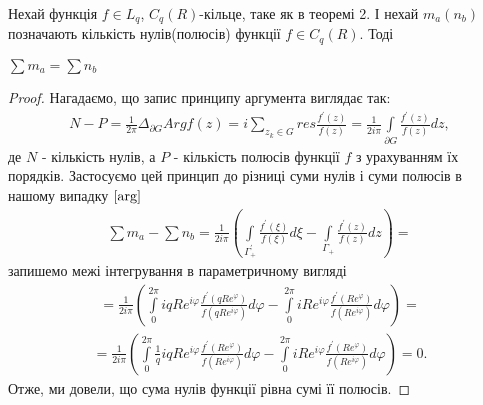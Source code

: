 \documentclass[12pt,a4paper]{article}
\begin{document}
\begin{thm}
Нехай функція $f\in L_{q}$, $C_{q}(R)$-кільце, таке як в теоремі 2. І нехай $m_{a}(n_{b})$ позначають кількість нулів(полюсів) функції $f \in C_{q}(R)$. Тоді 
\begin{center}
$\sum m_{a}=\sum n_{b}$
\end{center}
\end{thm}
\begin{proof}
Нагадаємо, що запис принципу аргумента виглядає так:
\begin{equation}\label{arg}
\begin{array}{l}                    
N-P=\frac{1}{2\pi} \Delta_{\partial G} Arg f(z) =i\sum\limits_{z_k\in G} res \frac{f^{'}(z)}{f(z)} = \frac{1}{2i\pi}\int\limits_{\partial G}^{ }\frac{f^{'}(z)}{f(z)} dz , 
\end{array}
\end{equation}
де $N$ - кількість нулів, а $P$ - кількість полюсів функції $f$ з урахуванням їх порядків.
Застосуємо цей принцип до різниці суми нулів і суми полюсів в нашому випадку $\eqref {arg} $
\[\begin{array}{l}
\sum m_{a}-\sum n_{b} = \frac{1}{2i\pi}(\int\limits_{\Gamma^{'}_{+}}^{ } \frac{f^{'}(\xi )}{f(\xi) }d\xi-\int\limits_{\Gamma_{+}}^{ } \frac{f^{'}(z)}{f(z)}dz)=
\end{array}\]
запишемо межі інтегрування в параметричному вигляді
\[\begin{array}{l}
= \frac{1}{2i\pi}(\int\limits_{0}^{2\pi }iqRe^{i\varphi}\frac{f^{'}(qRe^{\varphi})}{f(qRe^{i\varphi })}d\varphi -
    \int\limits_{0}^{2\pi }iRe^{i\varphi}\frac{f^{'}(Re^{\varphi})}{f(Re^{i\varphi })}d\varphi)=
\end{array}\]
\[\begin{array}{l}
= \frac{1}{2i\pi}(\int\limits_{0}^{2\pi }\frac{1}{q}iqRe^{i\varphi}\frac{f^{'}(Re^{\varphi})}{f(Re^{i\varphi })}d\varphi -
    \int\limits_{0}^{2\pi }iRe^{i\varphi}\frac{f^{'}(Re^{\varphi})}{f(Re^{i\varphi })}d\varphi)=0.
\end{array}\]
Отже, ми довели, що сума нулів функції рівна сумі її полюсів.
\end{proof}
\vspace{1,5cm}
\end{document}

